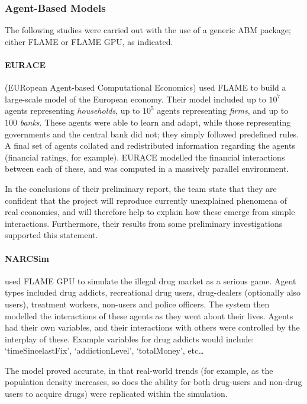 \documentclass[11pt,a4paper]{article}
\begin{document}
\subsubsection{Agent-Based Models}
The following studies were carried out with the use of a generic ABM package; either FLAME or FLAME GPU, as indicated.

\paragraph{EURACE} (EURopean Agent-based Computational Economics)
\cite{eurace} used FLAME to build a large-scale model of the European economy. Their model included up to $10^7$ agents representing \emph{households}, up to $10^5$ agents representing \emph{firms}, and up to $100$ \emph{banks}. These agents were able to learn and adapt, while those representing governments and the central bank did not; they simply followed predefined rules. A final set of agents collated and redistributed information regarding the agents (financial ratings, for example). EURACE modelled the financial interactions between each of these, and was computed in a massively parallel environment.

In the conclusions of their preliminary report, the team state that they are confident that the project will reproduce currently unexplained phenomena of real economies, and will therefore help to explain how these emerge from simple interactions. Furthermore, their results from some preliminary investigations supported this statement\cite{eurace}.

\paragraph{NARCSim}\cite{narcsim} used FLAME GPU to simulate the illegal drug market as a serious game. Agent types included drug addicts, recreational drug users, drug-dealers (optionally also users), treatment workers, non-users and police officers. The system then modelled the interactions of these agents as they went about their lives. Agents had their own variables, and their interactions with others were controlled by the interplay of these. Example variables for drug addicts would include: `timeSincelastFix', `addictionLevel', `totalMoney', etc\ldots

The model proved accurate, in that real-world trends (for example, as the population density increases, so does the ability for both drug-users and non-drug users to acquire drugs) were replicated within the simulation.
\end{document}
